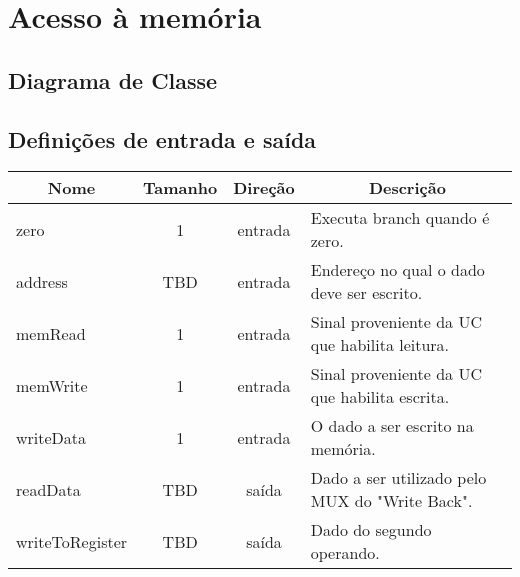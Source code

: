 \section{Acesso à memória}
	\subsection{Diagrama de Classe}
		\begin{center}
	\end{center}

\subsection{Definições de entrada e saída}

	\begin{center}
        \begin{longtable}[pos]{| l | c | c | m{7cm} |} \hline
          \multicolumn{1}{|c|}{\cellcolor[gray]{0.9}\textbf{Nome}} & 
          \multicolumn{1}{c|}{\cellcolor[gray]{0.9}\textbf{Tamanho}} & 
          \multicolumn{1}{c|}{\cellcolor[gray]{0.9}\textbf{Direção}} &
          \multicolumn{1}{c|}{\cellcolor[gray]{0.9}\textbf{Descrição}} \\ \hline
          \endhead
          \hline
          \endlastfoot

          zero          	       & 1   & entrada   & Executa branch quando é zero.    \\ \hline
          address                  & TBD & entrada   & Endereço no qual o dado deve ser escrito.    \\ \hline
          memRead                  & 1   & entrada   & Sinal proveniente da UC que habilita leitura.    \\ \hline
          memWrite                 & 1   & entrada   & Sinal proveniente da UC que habilita escrita.    \\ \hline
          writeData      		   & 1   & entrada   & O dado a ser escrito na memória. \\ \hline
          readData	               & TBD & saída     & Dado a ser utilizado pelo MUX do "Write Back".    \\ \hline
          writeToRegister          & TBD & saída     & Dado do segundo operando.    \\
        \end{longtable}
      \end{center}